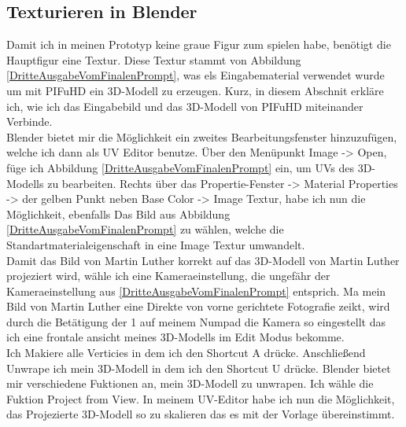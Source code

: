 \subsection{Texturieren in Blender}

Damit ich in meinen Prototyp keine graue Figur zum spielen habe, benötigt die Hauptfigur eine Textur. Diese Textur stammt von Abbildung \ref{DritteAusgabeVomFinalenPrompt}, was els Eingabematerial verwendet wurde um mit PIFuHD ein 3D-Modell zu erzeugen. Kurz, in diesem Abschnit erkläre ich, wie ich das Eingabebild und das 3D-Modell von PIFuHD miteinander Verbinde.
\\
Blender bietet mir die Möglichkeit ein zweites Bearbeitungsfenster hinzuzufügen, welche ich dann als UV Editor benutze. Über den Menüpunkt Image -> Open, füge ich Abbildung \ref{DritteAusgabeVomFinalenPrompt} ein, um UVs des 3D-Modells zu bearbeiten. Rechts über das Propertie-Fenster -> Material Properties -> der gelben Punkt neben Base Color -> Image Textur, habe ich nun die Möglichkeit, ebenfalls Das Bild aus Abbildung \ref{DritteAusgabeVomFinalenPrompt} zu wählen, welche die Standartmaterialeigenschaft in eine Image Textur umwandelt.
\\
Damit das Bild von Martin Luther korrekt auf das 3D-Modell von Martin Luther projeziert wird, wähle ich eine Kameraeinstellung, die ungefähr der Kameraeinstellung aus \ref{DritteAusgabeVomFinalenPrompt} entsprich. Ma mein Bild von Martin Luther eine Direkte von vorne gerichtete Fotografie zeikt, wird durch die Betätigung der 1 auf meinem Numpad die Kamera so eingestellt das ich eine frontale ansicht meines 3D-Modells im Edit Modus bekomme.
\\
Ich Makiere alle Verticies in dem ich den Shortcut A drücke. Anschließend Unwrape ich mein 3D-Modell in dem ich den Shortcut U drücke. Blender bietet mir verschiedene Fuktionen an, mein 3D-Modell zu unwrapen. Ich wähle die Fuktion Project from View. In meinem UV-Editor habe ich nun die Möglichkeit, das Projezierte 3D-Modell so zu skalieren das es mit der Vorlage übereinstimmt.
\\
